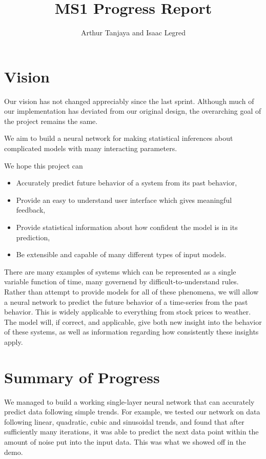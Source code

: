 \documentclass{article}
\title{MS1 Progress Report}
\author{Arthur Tanjaya and Isaac Legred}
\begin{document}
\maketitle

\section{Vision}
\label{sec:vision}

Our vision has not changed appreciably since the last sprint. Although much of our implementation has deviated from our original design, the overarching goal of the project remains the same.

We aim to build a neural network for making statistical inferences about complicated models with many
interacting parameters.

We hope this project can
\begin{itemize}
  \item Accurately predict future behavior of a system from its past behavior,
  \item Provide an easy to understand user interface which gives meaningful feedback,
  \item Provide statistical information about how confident the model is in its prediction,
  \item Be extensible and capable of many different types of input models.
\end{itemize}

There are many examples of systems which can be represented as a single variable function of time, many
governend by difficult-to-understand rules.  Rather than attempt to provide models for all of these
phenomena, we will allow a neural network to predict the future behavior of a time-series from the past behavior.  This is widely applicable to everything from stock prices to weather.  The model will, if correct, and applicable, give both new insight into the behavior of these systems, as well as information regarding how consistently these insights apply.

\section{Summary of Progress}
\label{sec:summary}

We managed to build a working single-layer neural network that can accurately predict data following simple trends. For example, we tested our network on data following linear, quadratic, cubic and sinusoidal trends, and found that after sufficiently many iterations, it was able to predict the next data point within the amount of noise put into the input data. This was what we showed off in the demo.
\end{document}
